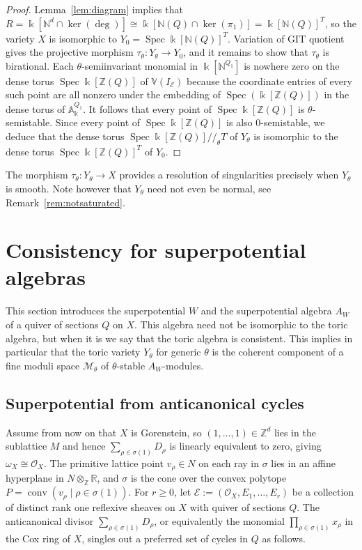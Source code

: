 \documentclass[11pt,a4paper]{amsart}
\numberwithin{equation}{section}
\theoremstyle{definition}
\theoremstyle{remark}
\newcommand{\kk}{\ensuremath{\Bbbk}}
\newcommand{\NN}{\ensuremath{\mathbb{N}}}
\newcommand{\RR}{\ensuremath{\mathbb{R}}}
\newcommand{\ZZ}{\ensuremath{\mathbb{Z}}}
\newcommand{\conv}{\operatorname{conv}}
\newcommand{\git}{\ensuremath{/\!\!/\!}}
\newcommand{\Ker}{\operatorname{ker}}
\newcommand{\Spec}{\operatorname{Spec}}
\begin{document}
\begin{proof}Lemma~\ref{lem:diagram} implies that $R=\kk[\NN^d\cap \Ker(\deg)]\cong \kk[\NN(Q)\cap \Ker(\pi_1)]=\kk[\NN(Q)]^T$, so the variety $X$ is isomorphic to $Y_0=\Spec \kk[\NN(Q)]^T$. Variation of GIT quotient gives the projective morphism $\tau_\theta\colon Y_\theta \to Y_0$, and it remains to show that $\tau_\theta$ is birational. Each $\theta$-semiinvariant monomial in $\kk[\NN^{Q_1}]$ is nowhere zero on the dense torus $\Spec\kk[\ZZ(Q)]$ of $\mathbb{V}(I_\mathscr{E})$ because the coordinate entries of every such point are all nonzero under the embedding of $\Spec(\kk[\ZZ(Q)])$ in the dense torus of $\mathbb{A}^{Q_1}_\kk$. It follows that every point of $\Spec \kk[\ZZ(Q)]$ is $\theta$-semistable. Since every point of $\Spec\kk[\ZZ(Q)]$ is also $0$-semistable, we deduce that the dense torus $\Spec\kk[\ZZ(Q)]\git_\theta T$ of $Y_\theta$ is isomorphic to the dense torus $\Spec\kk[\ZZ(Q)]^T$ of $Y_0$.\end{proof}

The morphism $\tau_\theta\colon Y_\theta\to X$ provides a resolution of singularities precisely when $Y_\theta$ is smooth. Note however that $Y_\theta$ need not even be normal, see Remark~\ref{rem:notsaturated}.






  \section{Consistency for superpotential algebras}
  \label{sec:superpotential}
  This section introduces the superpotential $W$ and the superpotential algebra $A_W$ of a quiver of sections $Q$ on $X$. This algebra need not be isomorphic to the toric algebra, but when it is we say that the toric algebra is consistent. This implies in particular that the toric variety $Y_\theta$ for generic $\theta$ is the coherent component of a fine moduli space $\mathcal{M}_\theta$ of $\theta$-stable $A_W$-modules.
   
  \subsection{Superpotential from anticanonical cycles}
Assume from now on that $X$ is Gorenstein, so $(1,\dots,1)\in \ZZ^d$ lies in the sublattice $M$ and hence $\sum_{\rho\in \sigma(1)} D_\rho$ is linearly equivalent to zero, giving $\omega_X\cong \mathcal{O}_X$. The primitive lattice point $v_\rho\in N$ on each ray in $\sigma$ lies in an affine hyperplane in $N\otimes_\ZZ \RR$, and $\sigma$ is the cone over the convex polytope $P=\conv(v_\rho \mid \rho \in \sigma(1))$. For $r\geq 0$, let $\mathscr{E}:=(\mathcal{O}_X,E_1,\dots,E_r)$ be a collection of distinct rank one reflexive sheaves on $X$ with quiver of sections $Q$. The anticanonical divisor $\sum_{\rho\in \sigma(1)} D_\rho$, or equivalently the monomial $\prod_{\rho\in \sigma(1)} x_\rho$ in the Cox ring of $X$,  singles out a preferred set of cycles in $Q$ as follows.
\end{document}
